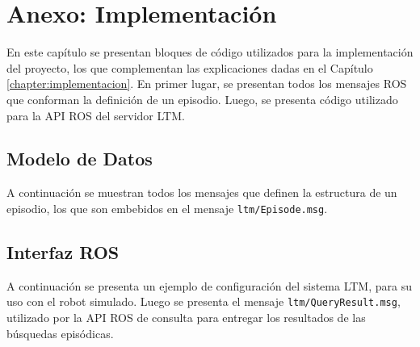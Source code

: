 \chapter{Anexo: Implementación}\label{chapter:appendix_b}

En este capítulo se presentan bloques de código utilizados para la implementación del proyecto, los que complementan las explicaciones dadas en el Capítulo \ref{chapter:implementacion}. En primer lugar, se presentan todos los mensajes ROS que conforman la definición de un episodio. Luego, se presenta código utilizado para la API ROS del servidor LTM.

\section{Modelo de Datos}\label{appendixB:modelo_datos}

A continuación se muestran todos los mensajes que definen la estructura de un episodio, los que son embebidos en el mensaje \texttt{ltm/Episode.msg}.


\lstset{style=/Style/ROS/MSG}











\section{Interfaz ROS}\label{appendixB:interfazROS}

A continuación se presenta un ejemplo de configuración del sistema LTM, para su uso con el robot simulado. Luego se presenta el mensaje \texttt{ltm/QueryResult.msg}, utilizado por la API ROS de consulta para entregar los resultados de las búsquedas episódicas.

\lstset{style=/Style/yaml/ROS}


\lstset{style=/Style/ROS/MSG}

